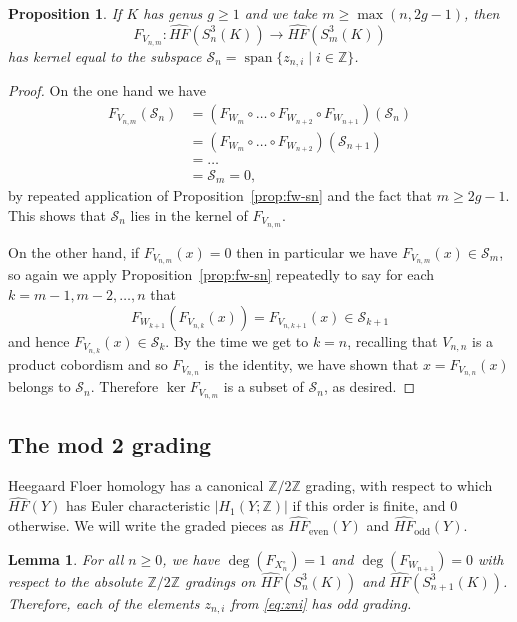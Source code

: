 \documentclass[11pt]{amsart}
\newtheorem {lemma}[theorem]{Lemma}
\newtheorem {proposition}[theorem]{Proposition}
\numberwithin{equation}{section}
\numberwithin{theorem}{section}
\theoremstyle{definition}
\newcommand{\Z}{\mathbb{Z}}
\newcommand{\cS}{\mathcal{S}}
\DeclareMathOperator{\Span}{span}
\newcommand{\hfhat}{\widehat{\mathit{HF}}}
\newcommand{\godd}{\mathrm{odd}}
\newcommand{\geven}{\mathrm{even}}
\begin{document}
\begin{proposition} \label{prop:ker-vmn}
If $K$ has genus $g \geq 1$ and we take $m \geq \max(n,2g-1)$, then 
\[ F_{V_{n,m}}: \hfhat(S^3_n(K)) \to \hfhat(S^3_m(K)) \]
has kernel equal to the subspace $\cS_n = \Span\{ z_{n,i} \mid i \in \Z \}$.
\end{proposition}

\begin{proof}
On the one hand we have
\begin{align*}
F_{V_{n,m}}(\cS_n) &= \left(F_{W_m}\circ \dots \circ F_{W_{n+2}} \circ F_{W_{n+1}}\right)(\cS_n) \\
&= \left(F_{W_m}\circ \dots \circ F_{W_{n+2}}\right)(\cS_{n+1}) \\
&= \dots \\
&= \cS_m = 0,
\end{align*}
by repeated application of Proposition~\ref{prop:fw-sn} and the fact that $m \geq 2g-1$.  This shows that $\cS_n$ lies in the kernel of $F_{V_{n,m}}$.

On the other hand, if $F_{V_{n,m}}(x) = 0$ then in particular we have $F_{V_{n,m}}(x) \in \cS_m$, so again we apply Proposition~\ref{prop:fw-sn} repeatedly to say for each $k=m-1,m-2,\dots,n$ that
\[ F_{W_{k+1}} \left( F_{V_{n,k}}(x) \right) = F_{V_{n,k+1}}(x) \in \cS_{k+1} \]
and hence $F_{V_{n,k}}(x) \in \cS_k$.  By the time we get to $k=n$, recalling that $V_{n,n}$ is a product cobordism and so $F_{V_{n,n}}$ is the identity, we have shown that $x = F_{V_{n,n}}(x)$ belongs to $\cS_n$.  Therefore $\ker F_{V_{n,m}}$ is a subset of $\cS_n$, as desired.
\end{proof}

%
%
%

\subsection{The mod 2 grading}

Heegaard Floer homology has  a canonical $\Z/2\Z$ grading, with respect to which $\hfhat(Y)$ has Euler characteristic $|H_1(Y;\Z)|$ if this order is finite, and $0$ otherwise.  We will write the graded pieces as $\hfhat_\geven(Y)$ and $\hfhat_\godd(Y)$.

\begin{lemma} \label{lem:cobordism-degree}
For all $n \geq 0$, we have $\deg(F_{X^\circ_n}) = 1$ and $\deg(F_{W_{n+1}}) = 0$ with respect to the absolute $\Z/2\Z$ gradings on $\hfhat(S^3_n(K))$ and $\hfhat(S^3_{n+1}(K))$.  Therefore, each of the elements $z_{n,i}$ from \eqref{eq:zni} has odd grading.
\end{lemma}
\end{document}

